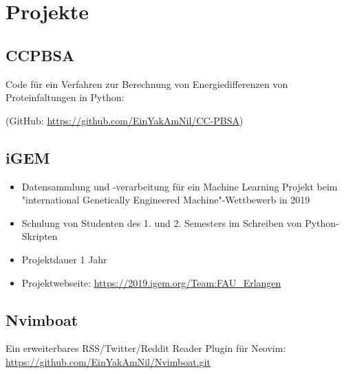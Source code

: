 \documentclass{article}
\begin{document}
\section{Projekte}

\subsection{CCPBSA}
Code für ein Verfahren zur Berechnung von Energiedifferenzen von Proteinfaltungen in Python:

(GitHub: \href{https://github.com/EinYakAmNil/CC-PBSA}{https://github.com/EinYakAmNil/CC-PBSA})

\subsection{iGEM}

\begin{itemize}
\item Datensammlung und -verarbeitung für ein Machine Learning Projekt beim "international Genetically Engineered Machine"-Wettbewerb in 2019
\item Schulung von Studenten des 1. und 2. Semesters im Schreiben von Python-Skripten
\item Projektdauer 1 Jahr
\item Projektwebseite: \href{https://2019.igem.org/Team:FAU_Erlangen}{https://2019.igem.org/Team:FAU\_Erlangen}
\end{itemize}

\subsection{Nvimboat}

Ein erweiterbares RSS/Twitter/Reddit Reader Plugin für Neovim: \href{https://github.com/EinYakAmNil/Nvimboat.git}{https://github.com/EinYakAmNil/Nvimboat.git}
\end{document}
